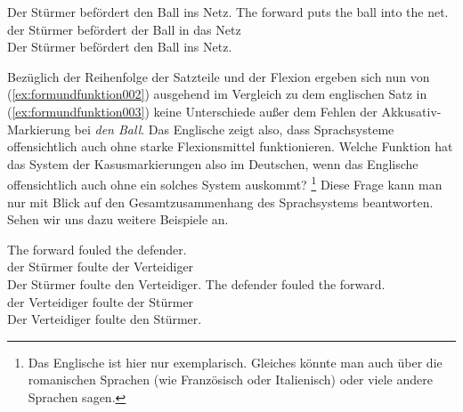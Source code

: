 \begin{exe}
  \ex\label{ex:formundfunktion001}
  \begin{xlist}
    \ex\label{ex:formundfunktion002} Der Stürmer befördert den Ball ins Netz.
    \ex\label{ex:formundfunktion003} \gll The forward puts the ball into the net.\\
    der Stürmer befördert der Ball in das Netz\\
    \glt Der Stürmer befördert den Ball ins Netz.
  \end{xlist}
\end{exe}

Bezüglich der Reihenfolge der Satzteile und der Flexion ergeben sich nun von (\ref{ex:formundfunktion002}) ausgehend im Vergleich zu dem englischen Satz in (\ref{ex:formundfunktion003}) keine Unterschiede außer dem Fehlen der Akkusativ-Markierung bei \textit{den Ball}.
Das Englische zeigt also, dass Sprachsysteme offensichtlich auch ohne starke Flexionsmittel funktionieren.
Welche Funktion hat das System der Kasusmarkierungen also im Deutschen, wenn das Englische offensichtlich auch ohne ein solches System auskommt?%
\footnote{Das Englische ist hier nur exemplarisch.
Gleiches könnte man \zB auch über die romanischen Sprachen (wie Französisch oder Italienisch) oder viele andere Sprachen sagen.}
Diese Frage kann man nur mit Blick auf den Gesamtzusammenhang des Sprachsystems beantworten.
Sehen wir uns dazu weitere Beispiele an.

\begin{exe}
  \ex \label{ex:formundfunktion004}
  \begin{xlist}
    \ex\label{ex:formundfunktion007} \gll The forward fouled the defender.\\
    der Stürmer foulte der Verteidiger\\
    \glt Der Stürmer foulte den Verteidiger.
    \ex\label{ex:formundfunktion008} \gll The defender fouled the forward.\\
    der Verteidiger foulte der Stürmer\\
    \glt Der Verteidiger foulte den Stürmer.
  \end{xlist}
\end{exe}

